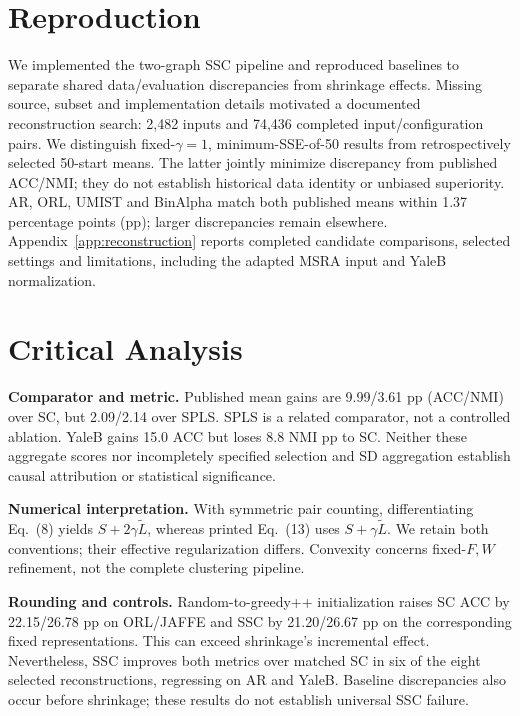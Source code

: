 \section{Reproduction}
\label{sec:reproduction}

We implemented the two-graph SSC pipeline and reproduced baselines to separate
shared data/evaluation discrepancies from shrinkage effects. Missing source,
subset and implementation details motivated a documented reconstruction search:
2,482 inputs and 74,436 completed input/configuration pairs. We distinguish
fixed-$\gamma=1$, minimum-SSE-of-50 results from retrospectively selected
50-start means. The latter jointly minimize discrepancy from published ACC/NMI;
they do not establish historical data identity or unbiased superiority.
AR, ORL, UMIST and BinAlpha match both published means within 1.37 percentage
points (pp); larger discrepancies remain elsewhere. Appendix~\ref{app:reconstruction}
reports completed candidate comparisons, selected settings and limitations,
including the adapted MSRA input and YaleB normalization.

\section{Critical Analysis}
\label{sec:critical_analysis}

\textbf{Comparator and metric.} Published mean gains are 9.99/3.61 pp
(ACC/NMI) over SC, but 2.09/2.14 over SPLS. SPLS is a related comparator,
not a controlled ablation. YaleB gains 15.0 ACC but loses 8.8 NMI pp to SC.
Neither these aggregate scores nor incompletely specified selection and
SD aggregation establish causal attribution or statistical significance.

\textbf{Numerical interpretation.} With symmetric pair counting, differentiating
Eq.~(8) yields $S+2\gamma\widetilde L$, whereas printed Eq.~(13) uses
$S+\gamma\widetilde L$. We retain both conventions; their effective
regularization differs. Convexity concerns fixed-$F,W$ refinement, not the
complete clustering pipeline.

\textbf{Rounding and controls.} Random-to-greedy++ initialization raises SC ACC
by 22.15/26.78 pp on ORL/JAFFE and SSC by 21.20/26.67 pp on the corresponding
fixed representations. This can exceed shrinkage's incremental effect.
Nevertheless, SSC improves both metrics over matched SC in six of the eight
selected reconstructions, regressing on AR and YaleB. Baseline discrepancies
also occur before shrinkage; these results do not establish universal SSC failure.

